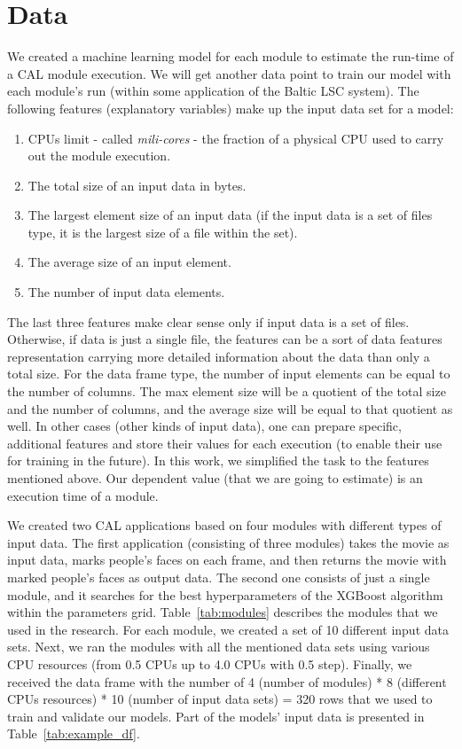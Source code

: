 \section{Data}

We created a machine learning model for each module to estimate the run-time of a CAL module execution. We will get another data point to train our model with each module's run (within some application of the Baltic LSC system). The following features (explanatory variables)  make up the input data set for a model:

\begin{enumerate}
	\item CPUs limit - called \textit{mili-cores} - the fraction of a physical CPU used to carry out the module execution.
	\item The total size of an input data in bytes.
	\item The largest element size of an input data (if the input data is a set of files type, it is the largest size of a file within the set).
	\item The average size of an input element.
	\item The number of input data elements.
\end{enumerate}

The last three features make clear sense only if input data is a set of files. Otherwise, if data is just a single file, the features can be a sort of data features representation carrying more detailed information about the data than only a total size. For the data frame type, the number of input elements can be equal to the number of columns. The max element size will be a quotient of the total size and the number of columns, and the average size will be equal to that quotient as well.  In other cases (other kinds of input data), one can prepare specific, additional features and store their values for each execution (to enable their use for training in the future).  In this work, we simplified the task to the features mentioned above. Our dependent value (that we are going to estimate) is an execution time of a module. 

We created two CAL applications based on four modules with different types of input data. The first application (consisting of three modules) takes the movie as input data, marks people's faces on each frame, and then returns the movie with marked people's faces as output data. The second one consists of just a single module, and it searches for the best hyperparameters of the XGBoost algorithm within the parameters grid. Table~\ref{tab:modules} describes the modules that we used in the research. For each module, we created a set of 10 different input data sets. Next, we ran the modules with all the mentioned data sets using various CPU resources (from 0.5 CPUs up to 4.0 CPUs with 0.5 step). Finally, we received the data frame with the number of 4 (number of modules) * 8 (different CPUs resources) * 10 (number of input data sets) = 320 rows that we used to train and validate our models. Part of the models' input data is presented in Table~\ref{tab:example_df}. 

